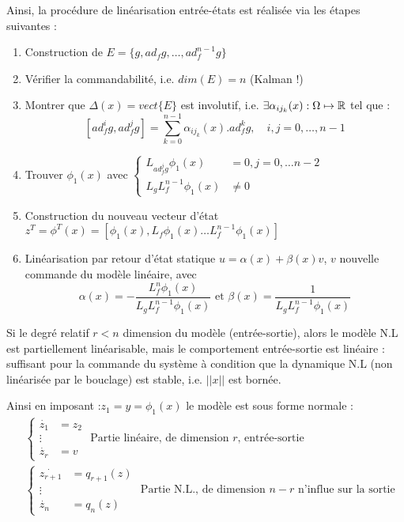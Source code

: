 \documentclass[main.tex]{subfiles}
\begin{document}
Ainsi, la procédure de linéarisation entrée-états est réalisée via les étapes suivantes :
\begin{enumerate}
\item Construction de $E = \{ g, ad_f g, \dots, ad_f^{n-1} g \}$
\item Vérifier la commandabilité, i.e. $dim(E) = n$ (Kalman !)
\item Montrer que $\Delta(x) = vect\{E\}$ est involutif, i.e. $\exists \alpha_{ij_k}(x) : \Omega \mapsto \mathbb{R}$ tel que :
\[ [ad_f^i g, ad_f^j g] = \sum_{k=0}^{n-1} \alpha_{ij_k}(x).ad_f^k g, \quad i,j = 0,\dots,n-1 \]
\item Trouver $\phi_1(x)$ avec $\begin{cases}L_{ad_f^j g} \phi_1(x) & = 0, j=0,\dots n-2 \\ L_gL_f^{n-1} \phi_1(x) & \neq 0 \end{cases}$
\item Construction du nouveau vecteur d'état $z^T = \phi^T(x) = [\phi_1(x), L_f\phi_1(x) \dots L_f^{n-1} \phi_1(x) ]$
\item Linéarisation par retour d'état statique $u = \alpha(x)+\beta(x)v$, $v$ nouvelle commande du modèle linéaire, avec 
\[ \alpha(x) = -\frac{L_f^n \phi_1(x)}{L_gL_f^{n-1}\phi_1(x)} \text{ et } \beta(x) = \frac{1}{L_gL_f^{n-1}\phi_1(x)} \]
\end{enumerate}

Si le degré relatif $r<n$ dimension du modèle (entrée-sortie), alors le modèle N.L est partiellement linéarisable, mais le comportement entrée-sortie est linéaire : suffisant pour la commande du système à condition que la dynamique N.L (non linéarisée par le bouclage) est stable, i.e. $||x||$ est bornée.


Ainsi en imposant :$z_1 = y = \phi_1(x)$ le modèle est sous forme normale : 
\begin{align*}
& \left\lbrace
\begin{array}{cc}
\dot{z_1} & = z_2 \\
\vdots \\
\dot{z_r} & = v
\end{array}
\right. \text{ Partie linéaire, de dimension $r$, entrée-sortie }\\
& \left\lbrace
\begin{array}{cc}
\dot{z_{r+1}} & = q_{r+1}(z) \\
\vdots \\
\dot{z_n} & = q_n(z)
\end{array}
\right.
\text{ Partie N.L., de dimension $n-r$ n'influe sur la sortie}
\end{align*}
\end{document}
